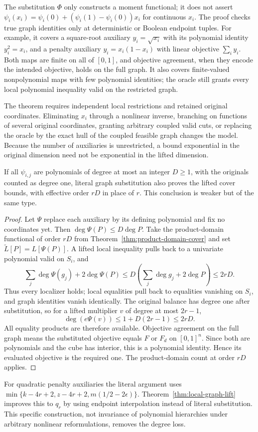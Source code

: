 The substitution $\Phi$ only constructs a moment functional; it does not
assert $\psi_i(x_i)=\psi_i(0)+(\psi_i(1)-\psi_i(0))x_i$ for continuous
$x_i$. The proof checks true graph identities only at deterministic or
Boolean endpoint tuples. For example, it covers a square-root auxiliary
$y_i=\sqrt{x_i}$ with its polynomial identity $y_i^2=x_i$, and a
penalty auxiliary $y_i=x_i(1-x_i)$ with linear objective $\sum_i y_i$.
Both maps are finite on all of $[0,1]$, and objective agreement, when
they encode the intended objective, holds on the full graph.
It also covers finite-valued nonpolynomial maps with few polynomial
identities; the oracle still grants every local polynomial inequality
valid on the restricted graph.

The theorem requires independent local restrictions and retained original
coordinates. Eliminating $x_i$ through a nonlinear inverse, branching on
functions of several original coordinates, granting arbitrary coupled
valid cuts, or replacing the oracle by the exact hull of the coupled
feasible graph changes the model. Because the number of auxiliaries is unrestricted, a bound exponential
in the original dimension need not be exponential in the lifted dimension.

\begin{proposition}
\label{prop:literal-lift}
If all $\psi_{i,j}$ are polynomials of degree at most an integer $D\ge1$,
with the originals counted as degree one, literal graph substitution
also proves the lifted cover bounds, with effective order $rD$ in place
of $r$. This conclusion is weaker but of the same type.
\end{proposition}
\begin{proof}
Let $\Psi$ replace each auxiliary by its defining polynomial and fix
no coordinates yet. Then $\deg\Psi(P)\le D\deg P$.
Take the product-domain functional of order $rD$ from
Theorem~\ref{thm:product-domain-cover} and set $\widetilde L[P]=L[\Psi(P)]$.
A lifted local inequality pulls back to a univariate polynomial valid on
$S_i$, and
\[
 \sum_j\deg\Psi(g_j)+2\deg\Psi(P)
 \le D\left(\sum_j\deg g_j+2\deg P\right)\le2rD.
\]
Thus every localizer holds; local equalities pull back to equalities
vanishing on $S_i$, and graph identities vanish identically.
The original balance has degree one after substitution, so for a lifted
multiplier $v$ of degree at most $2r-1$,
\[
 \deg(e\Psi(v))\le1+D(2r-1)\le2rD.
\]
All equality products are therefore available. Objective agreement on
the full graph means the substituted objective equals $F$ or $F_d$
on $[0,1]^n$. Since both are polynomials and the cube has interior, this
is a polynomial identity. Hence its evaluated objective is the required
one. The product-domain count at order $rD$ applies.
\end{proof}
For quadratic penalty auxiliaries the literal argument uses
$\min\{k-4r+2,z-4r+2,m(1/2-2\epsilon)\}$.
Theorem~\ref{thm:local-graph-lift} improves this to $q_r$ by using
endpoint interpolation instead of literal substitution. This specific
construction, not invariance of polynomial hierarchies under arbitrary
nonlinear reformulations, removes the degree loss.
